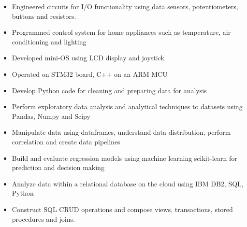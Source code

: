 \documentclass[11pt,a4paper,ragged2e]{altacv}
\begin{document}
\begin{paracol}{1}
\begin{itemize}
\item Engineered circuits for I/O functionality using data sensors, potentiometers, buttons and resistors.
\item Programmed control system for home appliances such as temperature, air conditioning and lighting 
\item Developed mini-OS using LCD display and joystick 
\item Operated on STM32 board, C++ on an ARM MCU
\end{itemize}

\medskip




\begin{itemize}
\item Develop Python code for cleaning and preparing data for analysis 
\item Perform exploratory data analysis and analytical techniques to datasets using Pandas, Numpy and Scipy
\item Manipulate data using dataframes, understand data distribution, perform correlation and create data pipelines
\item Build and evaluate regression models using machine learning scikit-learn for prediction and decision making
\end{itemize}
\tightdivider

\begin{itemize}
\item Analyze data within a relational database on the cloud using IBM DB2, SQL, Python
\item Construct SQL CRUD operations and compose views, transactions, stored procedures and joins.
\end{itemize}
\tightdivider


\end{paracol}
\end{document}
